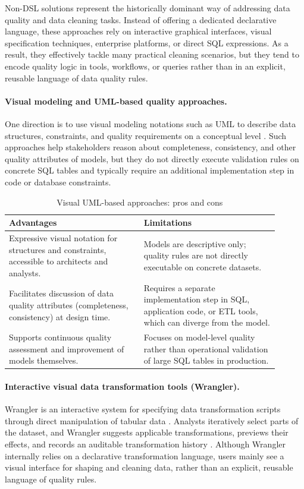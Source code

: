 Non-DSL solutions represent the historically dominant way of addressing data quality and data cleaning tasks. Instead of offering a dedicated declarative language, these approaches rely on interactive graphical interfaces, visual specification techniques, enterprise platforms, or direct SQL expressions. As a result, they effectively tackle many practical cleaning scenarios, but they tend to encode quality logic in tools, workflows, or queries rather than in an explicit, reusable language of data quality rules.

\paragraph{Visual modeling and UML-based quality approaches.}
One direction is to use visual modeling notations such as UML to describe data structures, constraints, and quality requirements on a conceptual level \cite{quality-assessment-uml}. 
Such approaches help stakeholders reason about completeness, consistency, and other quality attributes of models, but they do not directly execute validation rules on concrete SQL tables and typically require an additional implementation step in code or database constraints. 

\begin{table}[h]
\centering
\caption{Visual UML-based approaches: pros and cons}
\begin{tabular}{|p{0.45\linewidth}| p{0.45\linewidth}|}
\hline
\textbf{Advantages} & \textbf{Limitations} \\
\hline
Expressive visual notation for structures and constraints, accessible to architects and analysts. &
Models are descriptive only; quality rules are not directly executable on concrete datasets. \\
Facilitates discussion of data quality attributes (completeness, consistency) at design time. &
Requires a separate implementation step in SQL, application code, or ETL tools, which can diverge from the model. \\
Supports continuous quality assessment and improvement of models themselves. &
Focuses on model-level quality rather than operational validation of large SQL tables in production. \\
\hline
\end{tabular}
\end{table}

\paragraph{Interactive visual data transformation tools (Wrangler).}
Wrangler is an interactive system for specifying data transformation scripts through direct manipulation of tabular data \cite{wrangler}. 
Analysts iteratively select parts of the dataset, and Wrangler suggests applicable transformations, previews their effects, and records an auditable transformation history \cite{wrangler}. 
Although Wrangler internally relies on a declarative transformation language, users mainly see a visual interface for shaping and cleaning data, rather than an explicit, reusable language of quality rules.

